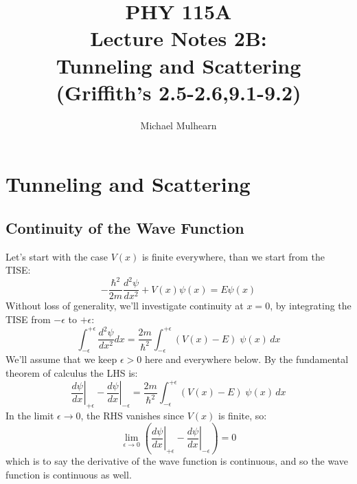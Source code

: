 \documentclass[12pt]{book}
\begin{document}
\newcommand{\ihbar}{\ensuremath{i \hbar}}
\newcommand{\Pss}{\ensuremath{\Psi^*}}
\newcommand{\dPsidt}{\ensuremath{ \frac{\partial \Psi}{\partial t} }}
\newcommand{\dPsidx}{\ensuremath{ \frac{\partial \Psi}{\partial x} }}
\newcommand{\ddPsidx}{\ensuremath{ \frac{\partial^2 \Psi}{\partial x^2} }}
\newcommand{\dPssdt}{\ensuremath{ \frac{\partial \Psi^*}{\partial t} }}
\newcommand{\dPssdx}{\ensuremath{ \frac{\partial \Psi^*}{\partial x} }}
\newcommand{\ddPssdx}{\ensuremath{ \frac{\partial^2 \Psi^*}{\partial x^2} }}

\newcommand{\dphidt}{\ensuremath{ \frac{d \phi}{dt} }}
\newcommand{\dpsidx}{\ensuremath{ \frac{d \psi}{dx} }}
\newcommand{\ddpsidx}{\ensuremath{ \frac{d^2 \psi}{dx^2} }}


\title{PHY 115A \\ Lecture Notes 2B: \\ 
Tunneling and Scattering \\
(Griffith's 2.5-2.6,9.1-9.2)}
\author{Michael Mulhearn}

\maketitle

\setcounter{chapter}{1}
\chapter{Tunneling and Scattering}
\setcounter{section}{25}
\setcounter{equation}{70}

\section{Continuity of the Wave Function}

Let's start with the case $V(x)$ is finite everywhere, than we start from the TISE:
$$-\frac{\hbar^2}{2m}\frac{d^2 \psi}{d x^2} + V(x) \psi(x) = E \psi(x)$$
Without loss of generality, we'll investigate continuity at $x=0$, by integrating the TISE from $-\epsilon$ to $+\epsilon$:
$$\int_{-\epsilon}^{+\epsilon}\frac{d^2 \psi}{d x^2} dx = \frac{2m}{\hbar^2}\int_{-\epsilon}^{+\epsilon} \left(V(x) - E\right) \; \psi(x) \, dx$$
We'll assume that we keep $\epsilon > 0$ here and everywhere below.  By the fundamental theorem of calculus the LHS is:
\begin{equation}
\label{eqn:psicont}
\left. \frac{d\psi}{d x} \right\rvert_{+\epsilon} 
- \left. \frac{d\psi}{d x} \right\rvert_{-\epsilon}
 = \frac{2m}{\hbar^2}\int_{-\epsilon}^{+\epsilon} \left(V(x) - E\right) \; \psi(x) \, dx
\end{equation}
In the limit $\epsilon \to 0$, the RHS vanishes since $V(x)$ is finite, so:
$$ \lim_{\epsilon \to 0} \left( \left. \frac{d\psi}{d x} \right\rvert_{+\epsilon} 
- \left. \frac{d\psi}{d x} \right\rvert_{-\epsilon} \right) = 0$$
which is to say the derivative of the wave function is continuous, and so the wave function is continuous as well.
\end{document}
